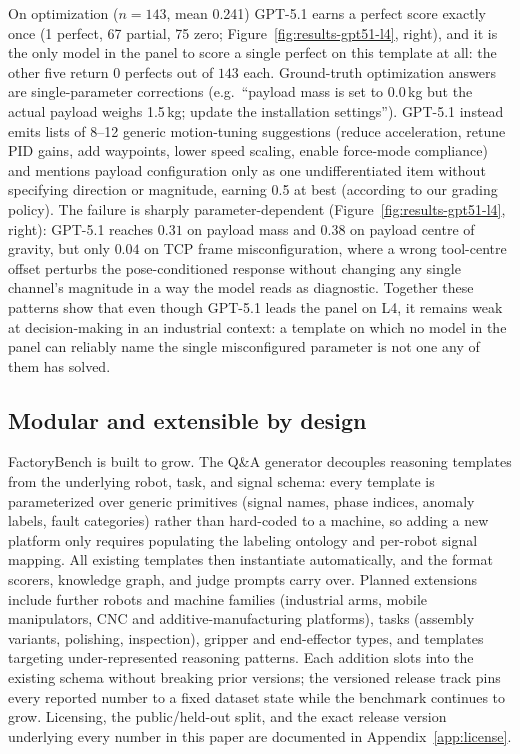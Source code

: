 On optimization ($n{=}143$, mean 0.241) GPT-5.1 earns a perfect score exactly once (1 perfect, 67 partial, 75 zero; Figure~\ref{fig:results-gpt51-l4}, right), and it is the only model in the panel to score a single perfect on this template at all: the other five return $0$ perfects out of $143$ each. Ground-truth optimization answers are single-parameter corrections (e.g.\ ``payload mass is set to 0.0\,kg but the actual payload weighs 1.5\,kg; update the installation settings''). GPT-5.1 instead emits lists of 8--12 generic motion-tuning suggestions (reduce acceleration, retune PID gains, add waypoints, lower speed scaling, enable force-mode compliance) and mentions payload configuration only as one undifferentiated item without specifying direction or magnitude, earning 0.5 at best (according to our grading policy). The failure is sharply parameter-dependent (Figure~\ref{fig:results-gpt51-l4}, right): GPT-5.1 reaches $0.31$ on payload mass and $0.38$ on payload centre of gravity, but only $0.04$ on TCP frame misconfiguration, where a wrong tool-centre offset perturbs the pose-conditioned response without changing any single channel's magnitude in a way the model reads as diagnostic. Together these patterns show that even though GPT-5.1 leads the panel on L4, it remains weak at decision-making in an industrial context: a template on which no model in the panel can reliably name the single misconfigured parameter is not one any of them has solved.

\subsection{Modular and extensible by design}

FactoryBench is built to grow. The Q\&A generator decouples reasoning templates from the underlying robot, task, and signal schema: every template is parameterized over generic primitives (signal names, phase indices, anomaly labels, fault categories) rather than hard-coded to a machine, so adding a new platform only requires populating the labeling ontology and per-robot signal mapping. All existing templates then instantiate automatically, and the format scorers, knowledge graph, and judge prompts carry over. Planned extensions include further robots and machine families (industrial arms, mobile manipulators, CNC and additive-manufacturing platforms), tasks (assembly variants, polishing, inspection), gripper and end-effector types, and templates targeting under-represented reasoning patterns. Each addition slots into the existing schema without breaking prior versions; the versioned release track pins every reported number to a fixed dataset state while the benchmark continues to grow. Licensing, the public/held-out split, and the exact release version underlying every number in this paper are documented in Appendix~\ref{app:license}.

